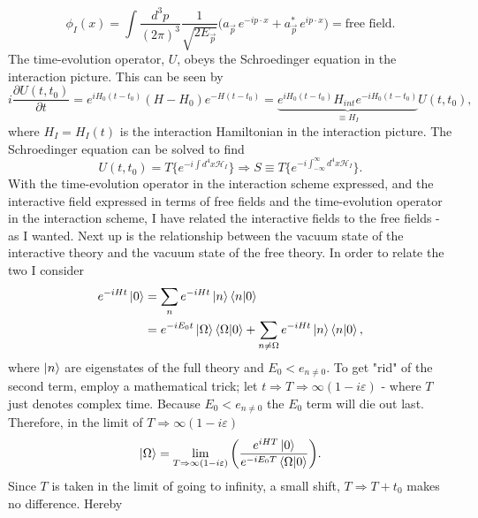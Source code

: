 \begin{equation}
	\phi_I(x)=\int \frac{d^3 p}{(2\pi)^3}\frac{1}{\sqrt{2E_{\vec{p}}}}\bigg(a_{\vec{p}}\,e^{-ip\cdot x}+a_{\vec{p}}^*\,e^{ip\cdot x}\bigg)=\text{free field}.
\end{equation} 
The time-evolution operator, $U$, obeys the Schroedinger equation in the interaction picture. This can be seen by
\begin{equation}
	i\frac{\partial U(t,t_0)}{\partial t}=e^{iH_0(t-t_0)}(H-H_0)e^{-H(t-t_0)}=\underbrace{e^{iH_0(t-t_0)}H_{int}e^{-iH_0(t-t_0)}}_{\equiv H_I}U(t,t_0),
\end{equation} 
where $H_I=H_I(t)$ is the interaction Hamiltonian in the interaction picture. The Schroedinger equation can be solved to find
\begin{equation}
	U(t,t_0)=T\{e^{-i\int d^4x \mathcal{H}_I}\}\Rightarrow S\equiv T\{e^{-i\int_{-\infty}^{\infty} d^4x \mathcal{H}_I}\}.
	\label{S}
\end{equation} 
With the time-evolution operator in the interaction scheme expressed, and the interactive field expressed in terms of free fields and the time-evolution operator in the interaction scheme, I have related the interactive fields to the free fields - as I wanted. Next up is the relationship between the vacuum state of the interactive theory and the vacuum state of the free theory. In order to relate the two I consider
\begin{equation}
	\begin{split}
		e^{-iHt}\ket{0}&=\sum_n
		e^{-iHt}\ket{n}\braket{n|0}\\
		&=e^{-iE_0t}\ket{\Omega}\braket{\Omega|0}+\sum_{n\neq \Omega}e^{-iHt}\ket{n}\braket{n|0},\\
	\end{split}
\end{equation} 
where $\ket{n}$ are eigenstates of the full theory and $E_0<e_{n\neq 0}$. To get "rid" of the second term, employ a mathematical trick; let $t\Rightarrow T\Rightarrow \infty (1-i\varepsilon)$ - where $T$ just denotes complex time. Because $E_0<e_{n\neq 0}$ the $E_0$ term will die out last. Therefore, in the limit of $T\Rightarrow \infty (1-i\varepsilon)$
\begin{equation}
	\ket{\Omega}=\lim\limits_{T\Rightarrow \infty (1-i\varepsilon)}\bigg(\frac{e^{iHT}\ket{0}}{e^{-iE_0T}\braket{\Omega|0}}\bigg).
\end{equation} 
Since $T$ is taken in the limit of going to infinity, a small shift, $T\Rightarrow T+t_0$ makes no difference. Hereby
